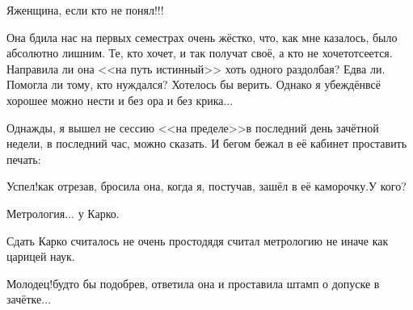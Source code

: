 \diagdash Я\mdash женщина, если кто не понял!!! 

Она бдила нас на первых семестрах очень жёстко, что, как мне казалось, было абсолютно лишним. Те, кто хочет, и так получат своё, а кто не хочет\mdash отсеется. Направила ли она <<на путь истинный>> хоть одного раздолбая? Едва ли. Помогла ли тому, кто нуждался? Хотелось бы верить. Однако я убеждён\mdash всё хорошее можно нести и без ора и без крика$\ldots$

Однажды, я вышел не сессию <<на пределе>>\mdash в последний день зачётной недели, в последний час, можно сказать. И бегом бежал в её кабинет проставить печать:

\diagdash Успел!\mdash как отрезав, бросила она, когда я, постучав, зашёл в её каморочку.\mdash У кого?

\diagdash Метрология$\ldots$ у Кар\sdash ко.

Сдать Кар\sdash ко считалось не очень просто\mdash дядя считал метрологию не иначе как царицей наук.

\diagdash Молодец!\mdash будто бы подобрев, ответила она и проставила штамп о допуске в зачётке$\ldots$

\begin{center}
\end{center}
